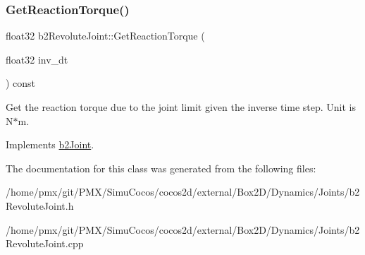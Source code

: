 \subsubsection{\texorpdfstring{Get\+Reaction\+Torque()}{GetReactionTorque()}\hspace{0.1cm}{\footnotesize\ttfamily [2/2]}}
{\footnotesize\ttfamily float32 b2\+Revolute\+Joint\+::\+Get\+Reaction\+Torque (\begin{DoxyParamCaption}\item[{float32}]{inv\+\_\+dt }\end{DoxyParamCaption}) const\hspace{0.3cm}{\ttfamily [virtual]}}

Get the reaction torque due to the joint limit given the inverse time step. Unit is N$\ast$m. 

Implements \hyperlink{classb2Joint_ae355e441c2aa842777dc04e24f15ced0}{b2\+Joint}.



The documentation for this class was generated from the following files\+:\begin{DoxyCompactItemize}
\item 
/home/pmx/git/\+P\+M\+X/\+Simu\+Cocos/cocos2d/external/\+Box2\+D/\+Dynamics/\+Joints/b2\+Revolute\+Joint.\+h\item 
/home/pmx/git/\+P\+M\+X/\+Simu\+Cocos/cocos2d/external/\+Box2\+D/\+Dynamics/\+Joints/b2\+Revolute\+Joint.\+cpp\end{DoxyCompactItemize}
